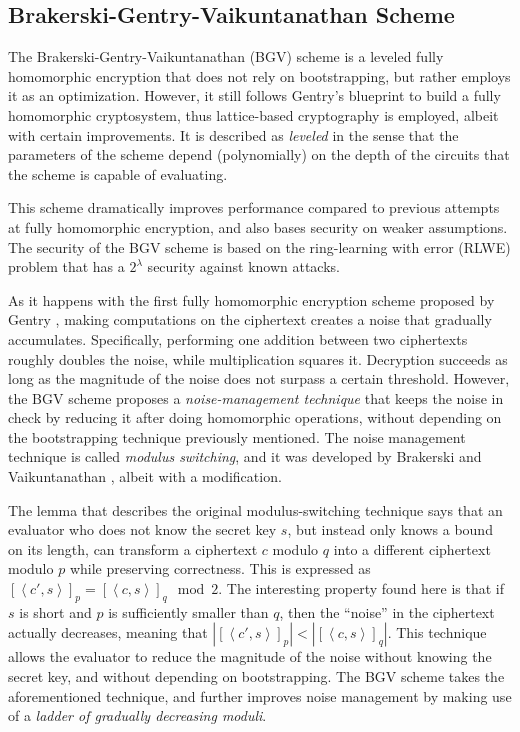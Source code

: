 \subsection{Brakerski-Gentry-Vaikuntanathan Scheme}

The Brakerski-Gentry-Vaikuntanathan (BGV) scheme \cite{cryptoeprint:2011:277} is a leveled fully homomorphic encryption that does not rely on bootstrapping, but rather employs it as an optimization. However, it still follows Gentry's blueprint to build a fully homomorphic cryptosystem, thus lattice-based cryptography is employed, albeit with certain improvements. It is described as \emph{leveled} in the sense that the parameters of the scheme depend (polynomially) on the depth of the circuits that the scheme is capable of evaluating.

This scheme dramatically improves performance compared to previous attempts at fully homomorphic encryption, and also bases security on weaker assumptions. The security of the BGV scheme is based on the ring-learning with error (RLWE) problem that has a $2^{\lambda}$ security against known attacks.

As it happens with the first fully homomorphic encryption scheme proposed by Gentry \cite{homoenc}, making computations on the ciphertext creates a noise that gradually accumulates. Specifically, performing one addition between two ciphertexts roughly doubles the noise, while multiplication squares it. Decryption succeeds as long as the magnitude of the noise does not surpass a certain threshold. However, the BGV scheme proposes a \emph{noise-management technique} that keeps the noise in check by reducing  it after doing homomorphic operations, without depending on the bootstrapping technique previously mentioned. The noise management technique is called \emph{modulus switching}, and it was developed by Brakerski and Vaikuntanathan \cite{cryptoeprint:2011:344}, albeit with a modification. 

The lemma that describes the original modulus-switching technique says that an evaluator who does not know the secret key $s$, but instead only knows a bound on its length, can transform a ciphertext $c$ modulo $q$ into a different ciphertext modulo $p$ while preserving correctness. This is expressed as $[\left \langle c',s \right \rangle]_{p} = [\left \langle c,s  \right \rangle]_{q} \mod 2$. The interesting property found here is that if $s$ is short and $p$ is sufficiently smaller than $q$, then the ``noise'' in the ciphertext actually decreases, meaning that $|[\left \langle c',s \right \rangle]_{p}| < |[\left \langle c,s \right \rangle]_{q}|$. This technique allows the evaluator to reduce the magnitude of the noise without knowing the secret key, and without depending on bootstrapping. The BGV scheme takes the aforementioned technique, and further improves noise management by making use of a \emph{ladder of gradually decreasing moduli}.  

